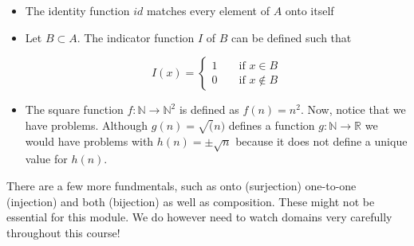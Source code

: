 \documentclass[12pt]{extbook}
\begin{document}
\begin{itemize}
\item The identity function $id$ matches every element of $A$ onto itself
\item Let $B \subset A$.   The indicator function $I$ of $B$  can be defined such that

\begin{displaymath}
I(x) = \left\{ \begin{array}{rrr} 1 && \mbox{ if } x \in B \\
0 & & \mbox{ if } x \notin B \end{array} \right.
\end{displaymath}

\item The square function $f : \mathbb{N} \to \mathbb{N}^2$ is defined as $f(n) = n^2$.   Now, notice that we have problems.   Although  $g(n) = \sqrt(n)$ defines a function $g : \mathbb{N} \to \mathbb{R}$ we would have problems with $h(n) = \pm \sqrt{ n}$ because it does not define a unique value for $h(n)$.
\end{itemize}

There are a few more fundmentals, such as onto (surjection) one-to-one (injection) and both (bijection) as well as composition.   These might not be essential for this module.   We do however need to watch domains very carefully throughout this course!


 
\end{document}
